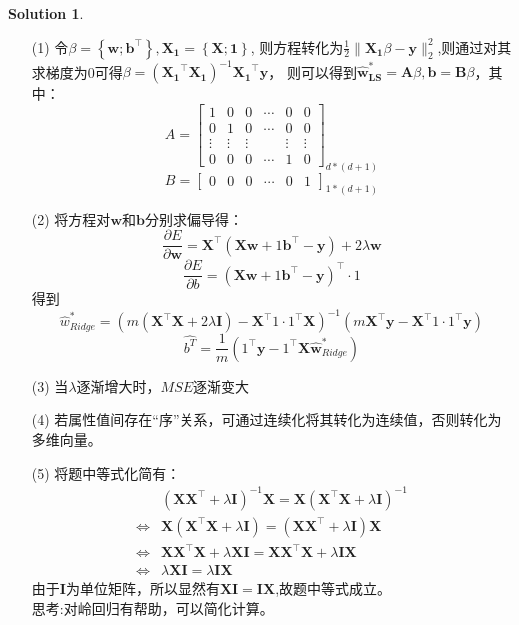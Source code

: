 \documentclass[a4paper,UTF8]{article}
\theoremstyle{definition}
\newtheorem*{solution}{Solution}
\begin{document}
\begin{solution}
	\begin{enumerate}
		\item[(1)] 令$\beta=\left\{\mathbf{w}; \mathbf{b}^{\top}\right\},\mathbf{X_1}=\left\{\mathbf{X};\mathbf{1}\right\}$,
		      则方程转化为$\frac{1}{2}\lVert \mathbf{X_1}\beta-\mathbf{y} \rVert_2^2 $,则通过对其求梯度为0可得$\beta=(\mathbf{X_1}^{\top}\mathbf{X_1})^{-1}\mathbf{X_1}^{\top}\mathbf{y}$，
		      则可以得到$\hat{\mathbf{w}}_{\textbf{LS}}^* = \mathbf{A}\beta,\mathbf{b} = \mathbf{B}\beta$，其中：
		      \[A = \begin{bmatrix}
				      1      & 0      & 0      & \cdots & 0      & 0      \\
				      0      & 1      & 0      & \cdots & 0      & 0      \\
				      \vdots & \vdots & \vdots &        & \vdots & \vdots \\
				      0      & 0      & 0      & \cdots & 1      & 0
			      \end{bmatrix}_{d * (d+1)}\]
		      \[B=\begin{bmatrix}
				      0 & 0 & 0 & \cdots & 0 & 1
			      \end{bmatrix}_{1*(d+1)}\]
		\item[(2)]
		      将方程对$\mathbf{w}$和$\mathbf{b}$分别求偏导得：
		      \[\frac{\partial{E}}{\partial{\mathbf{w}}} = \mathbf{X}^{\top}(\mathbf{X}\mathbf{w}+1\mathbf{b}^{\top}-\mathbf{y})+2\lambda \mathbf{w}\]
		      \[\frac{\partial{E}}{\partial{b}}=(\mathbf{X}\mathbf{w}+1\mathbf{b}^{\top}-\mathbf{y})^{\top}·1\]
		      得到
		      \[\hat{w}^*_{Ridge}=(m(\mathbf{X}^{\top}\mathbf{X}+2\lambda \mathbf{I})-\mathbf{X}^{\top}1·1^{\top}\mathbf{X})^{-1}(m\mathbf{X}^{\top}\mathbf{y}-\mathbf{X}^{\top}1·1^{\top}\mathbf{y})\]
		      \[\hat{b^T}=\frac{1}{m}(1^{\top}\mathbf{y}-1^{\top}\mathbf{X}\hat{\mathbf{w}}^*_{Ridge})\]
		\item[(3)]当$\lambda$逐渐增大时，$MSE$逐渐变大
		\item[(4)]
		      若属性值间存在“序”关系，可通过连续化将其转化为连续值，否则转化为多维向量。
		\item[(5)]
		      将题中等式化简有：
		      \begin{align*}
			                      & \left(\mathbf{X X}^{\top}+\lambda \mathbf{I}\right)^{-1} \mathbf{X}=\mathbf{X}\left(\mathbf{X}^{\top} \mathbf{X}+\lambda \mathbf{I}\right)^{-1} \\
			      \Leftrightarrow & \mathbf{X}(\mathbf{X}^{\top}\mathbf{X}+\lambda\mathbf{I})=(\mathbf{X}\mathbf{X}^{\top}+\lambda\mathbf{I})\mathbf{X}                             \\
			      \Leftrightarrow & \mathbf{X}\mathbf{X}^{\top}\mathbf{X}+\lambda\mathbf{X}\mathbf{I} =\mathbf{X}\mathbf{X}^{\top}\mathbf{X}+\lambda\mathbf{I}\mathbf{X}            \\
			      \Leftrightarrow & \lambda\mathbf{X}\mathbf{I}=\lambda\mathbf{I}\mathbf{X}
		      \end{align*}
		      由于$\mathbf{I}$为单位矩阵，所以显然有$\mathbf{X}\mathbf{I}=\mathbf{I}\mathbf{X}$,故题中等式成立。\\
		      思考:对岭回归有帮助，可以简化计算。
	\end{enumerate}


\end{solution}
\end{document}
